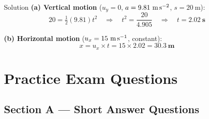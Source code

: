 \begin{examplebox}{Solution}
\textbf{(a) Vertical motion} ($u_y = 0$, $a = 9.81\ \text{m\,s}^{-2}$, $s = 20\ \text{m}$):
$$20 = \tfrac{1}{2}(9.81)t^2 \quad \Rightarrow \quad t^2 = \frac{20}{4.905} \quad \Rightarrow \quad t = \mathbf{2.02\ \text{s}}$$

\textbf{(b) Horizontal motion} ($u_x = 15\ \text{m\,s}^{-1}$, constant):
$$x = u_x \times t = 15 \times 2.02 = \mathbf{30.3\ \text{m}}$$
\end{examplebox}

\pagebreak

\section{Practice Exam Questions}

\subsection*{Section A — Short Answer Questions}

